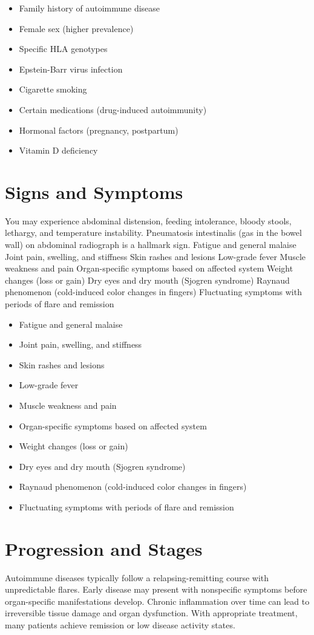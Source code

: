 \begin{itemize}[noitemsep]
  \item Family history of autoimmune disease
  \item Female sex (higher prevalence)
  \item Specific HLA genotypes
  \item Epstein-Barr virus infection
  \item Cigarette smoking
  \item Certain medications (drug-induced autoimmunity)
  \item Hormonal factors (pregnancy, postpartum)
  \item Vitamin D deficiency
\end{itemize}
\section{Signs and Symptoms}
You may experience abdominal distension, feeding intolerance, bloody stools, lethargy, and temperature instability. Pneumatosis intestinalis (gas in the bowel wall) on abdominal radiograph is a hallmark sign. Fatigue and general malaise Joint pain, swelling, and stiffness Skin rashes and lesions Low-grade fever Muscle weakness and pain Organ-specific symptoms based on affected system Weight changes (loss or gain) Dry eyes and dry mouth (Sjogren syndrome) Raynaud phenomenon (cold-induced color changes in fingers) Fluctuating symptoms with periods of flare and remission

\begin{itemize}[noitemsep]
  \item Fatigue and general malaise
  \item Joint pain, swelling, and stiffness
  \item Skin rashes and lesions
  \item Low-grade fever
  \item Muscle weakness and pain
  \item Organ-specific symptoms based on affected system
  \item Weight changes (loss or gain)
  \item Dry eyes and dry mouth (Sjogren syndrome)
  \item Raynaud phenomenon (cold-induced color changes in fingers)
  \item Fluctuating symptoms with periods of flare and remission
\end{itemize}
\section{Progression and Stages}
Autoimmune diseases typically follow a relapsing-remitting course with unpredictable flares. Early disease may present with nonspecific symptoms before organ-specific manifestations develop. Chronic inflammation over time can lead to irreversible tissue damage and organ dysfunction. With appropriate treatment, many patients achieve remission or low disease activity states.

